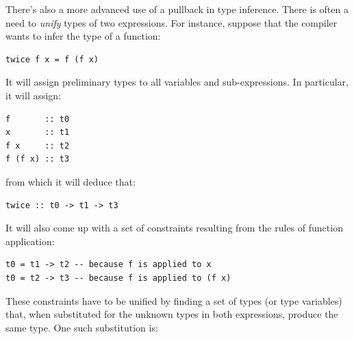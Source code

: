 \begin{figure}[H]
    \centering
\end{figure}

There's also a more advanced use of a pullback in type inference. There
is often a need to \emph{unify} types of two expressions. For instance,
suppose that the compiler wants to infer the type of a function:

\begin{verbatim}
twice f x = f (f x)
\end{verbatim}

It will assign preliminary types to all variables and sub-expressions.
In particular, it will assign:

\begin{verbatim}
f       :: t0 
x       :: t1 
f x     :: t2 
f (f x) :: t3
\end{verbatim}

from which it will deduce that:

\begin{verbatim}
twice :: t0 -> t1 -> t3
\end{verbatim}

It will also come up with a set of constraints resulting from the rules
of function application:

\begin{verbatim}
t0 = t1 -> t2 -- because f is applied to x 
t0 = t2 -> t3 -- because f is applied to (f x)
\end{verbatim}

These constraints have to be unified by finding a set of types (or type
variables) that, when substituted for the unknown types in both
expressions, produce the same type. One such substitution is:

